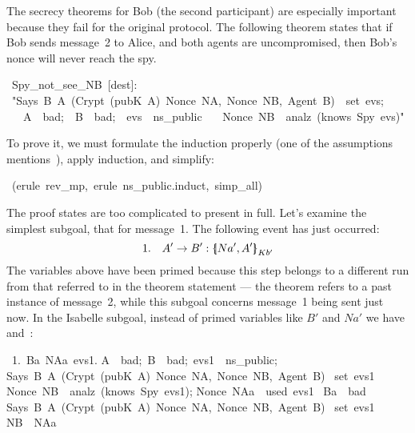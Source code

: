 The secrecy theorems for Bob (the second participant) are especially
important because they fail for the original protocol.  The following
theorem states that if Bob sends message~2 to Alice, and both agents are
uncompromised, then Bob's nonce will never reach the spy.
\begin{isabelle}
\ Spy_not_see_NB\ [dest]:\isanewline
\ "\isasymlbrakk Says\ B\ A\ (Crypt\ (pubK\ A)\ \isasymlbrace Nonce\ NA,\ Nonce\ NB,\ Agent\ B\isasymrbrace )\ \isasymin \ set\ evs;\isanewline
\ \ \ A\ \isasymnotin \ bad;\ \ B\ \isasymnotin \ bad;\ \ evs\ \isasymin \ ns_public\isasymrbrakk \isanewline
\ \ \isasymLongrightarrow \ Nonce\ NB\ \isasymnotin \ analz\ (knows\ Spy\ evs)"
\end{isabelle}
%
To prove it, we must formulate the induction properly (one of the
assumptions mentions~), apply induction, and simplify:
\begin{isabelle}
\ (erule\ rev_mp,\ erule\ ns_public.induct,\ simp_all)
\end{isabelle}
%
The proof states are too complicated to present in full.  
Let's examine the simplest subgoal, that for message~1.  The following
event has just occurred:
\[ 1.\quad  A'\to B'  : \mathopen{\{\kern-.30em|} Na',A'\mathclose{|\kern-.32em\}}\sb{Kb'} \]
The variables above have been primed because this step
belongs to a different run from that referred to in the theorem
statement --- the theorem
refers to a past instance of message~2, while this subgoal
concerns message~1 being sent just now.
In the Isabelle subgoal, instead of primed variables like $B'$ and $Na'$
we have  and~:
\begin{isabelle}
\ 1.\ \isasymAnd Ba\ NAa\ evs1.\isanewline
{}\isasymlbrakk A\ \isasymnotin \ bad;\ B\ \isasymnotin \ bad;\ evs1\ \isasymin \ ns_public;\isanewline
{}Says\ B\ A\ (Crypt\ (pubK\ A)\ \isasymlbrace Nonce\ NA,\ Nonce\ NB,\ Agent\ B\isasymrbrace )\isanewline
{}\isasymin \ set\ evs1\ \isasymlongrightarrow \isanewline
{}Nonce\ NB\ \isasymnotin \ analz\ (knows\ Spy\ evs1);\isanewline
{}Nonce\ NAa\ \isasymnotin \ used\ evs1\isasymrbrakk \isanewline
{}\isasymLongrightarrow \ Ba\ \isasymin \ bad\ \isasymlongrightarrow \isanewline
{}Says\ B\ A\ (Crypt\ (pubK\ A)\ \isasymlbrace Nonce\ NA,\ Nonce\ NB,\ Agent\ B\isasymrbrace )\isanewline
{}\isasymin \ set\ evs1\ \isasymlongrightarrow \isanewline
{}NB\ \isasymnoteq \ NAa
\end{isabelle}
